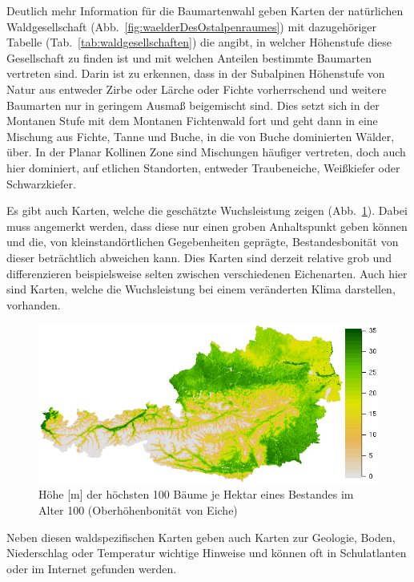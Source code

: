 \documentclass[twocolumn]{scrartcl}
\begin{document}
Deutlich mehr Information für die Baumartenwahl geben Karten der
natürlichen Waldgesellschaft (Abb.~\ref{fig:waelderDesOstalpenraumes})
mit dazugehöriger Tabelle (Tab.~\ref{tab:waldgesellschaften}) die
angibt, in welcher Höhenstufe diese Gesellschaft zu finden ist und mit
welchen Anteilen bestimmte Baumarten vertreten sind. Darin ist zu
erkennen, dass in der Subalpinen Höhenstufe von Natur aus entweder
Zirbe oder Lärche oder Fichte vorherrschend und weitere Baumarten nur
in geringem Ausmaß beigemischt sind. Dies setzt sich in der Montanen
Stufe mit dem Montanen Fichtenwald fort und geht dann in eine Mischung
aus Fichte, Tanne und Buche, in die von Buche dominierten Wälder,
über. In der Planar Kollinen Zone sind Mischungen häufiger vertreten,
doch auch hier dominiert, auf etlichen Standorten, entweder
Traubeneiche, Weißkiefer oder Schwarzkiefer.

Es gibt auch Karten, welche die geschätzte Wuchsleistung zeigen
(Abb.~\ref{fig:Eichenbonitaet}). Dabei muss angemerkt werden, dass
diese nur einen groben Anhaltspunkt geben können und die, von
kleinstandörtlichen Gegebenheiten geprägte, Bestandesbonität von
dieser beträchtlich abweichen kann. Dies Karten sind derzeit relative
grob und differenzieren beispielsweise selten zwischen verschiedenen
Eichenarten. Auch hier sind Karten, welche die Wuchsleistung bei
einem veränderten Klima darstellen, vorhanden.

\begin{figure}[htbp]
  \centering
  \includegraphics[width=.95\columnwidth]{./pic/quSp_t0_p1.png}
  \caption{Höhe [m] der höchsten 100 Bäume je Hektar eines Bestandes im
    Alter 100 (Oberhöhenbonität von Eiche)
    \citep[S.~17]{kindermann2021Eiche}}
  \label{fig:Eichenbonitaet}
\end{figure}

Neben diesen waldspezifischen Karten geben auch Karten zur Geologie,
Boden, Niederschlag oder Temperatur wichtige Hinweise und können oft
in Schulatlanten oder im Internet gefunden werden.
\end{document}
